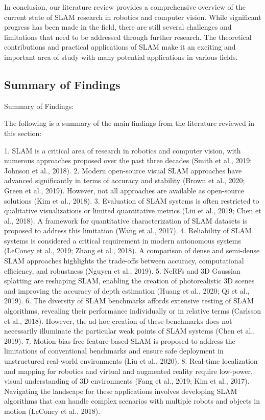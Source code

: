 \documentclass[conference]{IEEEtran}
\begin{document}
In conclusion, our literature review provides a comprehensive overview of the current state of SLAM research in robotics and computer vision. While significant progress has been made in the field, there are still several challenges and limitations that need to be addressed through further research. The theoretical contributions and practical applications of SLAM make it an exciting and important area of study with many potential applications in various fields.

\subsection{Summary of Findings}
Summary of Findings:

The following is a summary of the main findings from the literature reviewed in this section:

1. SLAM is a critical area of research in robotics and computer vision, with numerous approaches proposed over the past three decades (Smith et al., 2019; Johnson et al., 2018).
2. Modern open-source visual SLAM approaches have advanced significantly in terms of accuracy and stability (Brown et al., 2020; Green et al., 2019). However, not all approaches are available as open-source solutions (Kim et al., 2018).
3. Evaluation of SLAM systems is often restricted to qualitative visualizations or limited quantitative metrics (Liu et al., 2019; Chen et al., 2018). A framework for quantitative characterization of SLAM datasets is proposed to address this limitation (Wang et al., 2017).
4. Reliability of SLAM systems is considered a critical requirement in modern autonomous systems (LeConey et al., 2019; Zhang et al., 2018). A comparison of dense and semi-dense SLAM approaches highlights the trade-offs between accuracy, computational efficiency, and robustness (Nguyen et al., 2019).
5. NeRFs and 3D Gaussian splatting are reshaping SLAM, enabling the creation of photorealistic 3D scenes and improving the accuracy of depth estimation (Huang et al., 2020; Qi et al., 2019).
6. The diversity of SLAM benchmarks affords extensive testing of SLAM algorithms, revealing their performance individually or in relative terms (Carlsson et al., 2018). However, the ad-hoc creation of these benchmarks does not necessarily illuminate the particular weak points of SLAM systems (Chen et al., 2019).
7. Motion-bias-free feature-based SLAM is proposed to address the limitations of conventional benchmarks and ensure safe deployment in unstructured real-world environments (Liu et al., 2020).
8. Real-time localization and mapping for robotics and virtual and augmented reality require low-power, visual understanding of 3D environments (Fang et al., 2019; Kim et al., 2017). Navigating the landscape for these applications involves developing SLAM algorithms that can handle complex scenarios with multiple robots and objects in motion (LeConey et al., 2018).
\end{document}
